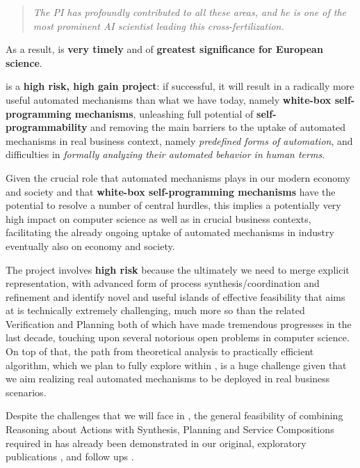 \begin{quote}{\it
The PI has profoundly contributed to all these areas, and he is %
one of the most prominent AI scientist leading this cross-fertilization.}
\end{quote}


As a result, \project is \textbf{very timely} and of \textbf{greatest significance for European science}.

\project is a \textbf{high risk, high gain project}: if successful, it
will result in a radically more useful automated mechanisms than what
we have today, namely \textbf{white-box self-programming mechanisms},
unleashing full potential of \textbf{self-programmability} and
removing the main barriers to the uptake of automated mechanisms in
real business context, namely \textit{predefined forms of automation}, and
difficulties in \textit{formally analyzing their automated behavior in human terms}.

Given the crucial role that automated mechanisms plays in our modern economy and society and that \textbf{white-box self-programming mechanisms} have the potential to resolve a number of central hurdles, %
this implies a potentially very high impact on computer science as well as in crucial  business contexts, facilitating the already ongoing uptake of automated mechanisms in industry eventually also on economy and society. 

The \project project involves \textbf{high risk} because the ultimately we need to merge explicit representation, with advanced form of process synthesis/coordination and refinement and  identify novel and useful islands of effective feasibility that \project aims at is technically extremely challenging, much more so than the related Verification and  Planning both of which have made tremendous progresses in the last decade, touching upon several notorious open problems in computer science. 
On top of that, the path from theoretical analysis to practically efficient algorithm, which we plan to fully explore within \project, is a huge challenge given that we aim realizing real automated mechanisms to be deployed in real business scenarios. 

Despite the challenges that we will face in \project, the general feasibility of combining Reasoning about Actions with Synthesis, Planning and Service Compositions required in \project has already been demonstrated in our original, exploratory publications \cite{IJCAI13,IJCAI15,IJCAI16,BPM,AIJ13,AIJ14}, and follow ups \cite{IJCAI15,AAAI17,}. 



